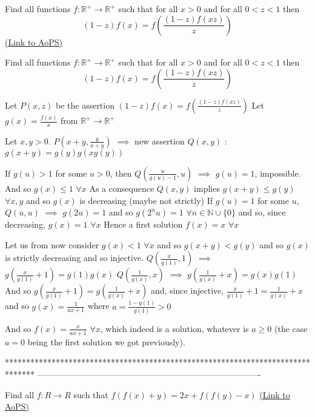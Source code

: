 \begin{problem}
	Find all functions $f: \mathbb R^+ \to\mathbb R^+$ such that  for all $x > 0$ and for all  $ 0 < z < 1$ then \[ (1-z)f(x) = f\left( \dfrac{(1-z)f(xz)}{z}\right)\]
	\flushright \href{https://artofproblemsolving.com/community/c6h581862}{(Link to AoPS)}
\end{problem}



\begin{solution}
	\begin{tcolorbox}Find all functions $f: \mathbb R^+ \to\mathbb R^+$ such that  for all $x > 0$ and for all  $ 0 < z < 1$ then \[ (1-z)f(x) = f\left( \dfrac{(1-z)f(xz)}{z}\right)\]\end{tcolorbox}
Let $P(x,z)$ be the assertion $(1-z)f(x)=f\left(\frac{(1-z)f(xz)}{z}\right)$
Let $g(x)=\frac{f(x)}x$ from $\mathbb R^+\to\mathbb R^+$

Let $x,y>0$. $P(x+y,\frac y{x+y})$ $\implies$ new assertion $Q(x,y)$ : $g(x+y)=g(y)g(xg(y))$

If $g(u)>1$ for some $u>0$, then $Q(\frac u{g(u)-1},u)$ $\implies$ $g(u)=1$, impossible. And so $g(x)\le 1$ $\forall x$
As a consequence $Q(x,y)$ implies $g(x+y)\le g(y)$ $\forall x,y$ and so $g(x)$ is decreasing (maybe not strictly)
If $g(u)=1$ for some $u$, $Q(u,u)$ $\implies$ $g(2u)=1$ and so $g(2^n u)=1$ $\forall n\in\mathbb N\cup\{0\}$ and so, since decreasing, $g(x)=1$ $\forall x$
Hence a first solution $f(x)=x$ $\forall x$

Let us from now consider $g(x)<1$ $\forall x$ and so $g(x+y)<g(y)$ and so $g(x)$ is strictly decreasing and so injective.
$Q(\frac x{g(1)},1)$ $\implies$ $g(\frac x{g(1)}+1)=g(1)g(x)$
$Q(\frac 1{g(x)},x)$ $\implies$ $g(\frac 1{g(x)}+x)=g(x)g(1)$
And so $g(\frac x{g(1)}+1)=g(\frac 1{g(x)}+x)$ and, since injective, $\frac x{g(1)}+1=\frac 1{g(x)}+x$ and so $g(x)=\frac 1{ax+1}$ where $a=\frac {1-g(1)}{g(1)}>0$

And so $\boxed{f(x)=\frac x{ax+1}}$ $\forall x$, which indeed is a solution, whatever is $a\ge 0$ (the case $a=0$ being the first solution we got previously).
\end{solution}
*******************************************************************************
-------------------------------------------------------------------------------

\begin{problem}
	Find all $f:R \rightarrow R$ such that
$f(f(x)+y)=2x+f(f(y)-x)$
	\flushright \href{https://artofproblemsolving.com/community/c6h581869}{(Link to AoPS)}
\end{problem}



